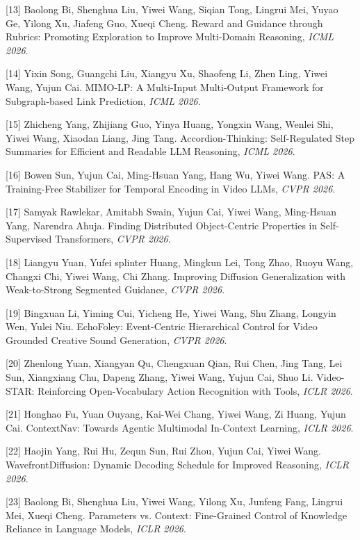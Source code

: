 [13] Baolong Bi, Shenghua Liu, Yiwei Wang, Siqian Tong, Lingrui Mei, Yuyao Ge, Yilong Xu, Jiafeng Guo, Xueqi Cheng. Reward and Guidance through Rubrics: Promoting Exploration to Improve Multi-Domain Reasoning, \textit{ICML 2026}.

[14] Yixin Song, Guangchi Liu, Xiangyu Xu, Shaofeng Li, Zhen Ling, Yiwei Wang, Yujun Cai. MIMO-LP: A Multi-Input Multi-Output Framework for Subgraph-based Link Prediction, \textit{ICML 2026}.

[15] Zhicheng Yang, Zhijiang Guo, Yinya Huang, Yongxin Wang, Wenlei Shi, Yiwei Wang, Xiaodan Liang, Jing Tang. Accordion-Thinking: Self-Regulated Step Summaries for Efficient and Readable LLM Reasoning, \textit{ICML 2026}.

[16] Bowen Sun, Yujun Cai, Ming-Hsuan Yang, Hang Wu, Yiwei Wang. PAS: A Training-Free Stabilizer for Temporal Encoding in Video LLMs, \textit{CVPR 2026}.

[17] Samyak Rawlekar, Amitabh Swain, Yujun Cai, Yiwei Wang, Ming-Hsuan Yang, Narendra Ahuja. Finding Distributed Object-Centric Properties in Self-Supervised Transformers, \textit{CVPR 2026}.

[18] Liangyu Yuan, Yufei splinter Huang, Mingkun Lei, Tong Zhao, Ruoyu Wang, Changxi Chi, Yiwei Wang, Chi Zhang. Improving Diffusion Generalization with Weak-to-Strong Segmented Guidance, \textit{CVPR 2026}.

[19] Bingxuan Li, Yiming Cui, Yicheng He, Yiwei Wang, Shu Zhang, Longyin Wen, Yulei Niu. EchoFoley: Event-Centric Hierarchical Control for Video Grounded Creative Sound Generation, \textit{CVPR 2026}.

[20] Zhenlong Yuan, Xiangyan Qu, Chengxuan Qian, Rui Chen, Jing Tang, Lei Sun, Xiangxiang Chu, Dapeng Zhang, Yiwei Wang, Yujun Cai, Shuo Li. Video-STAR: Reinforcing Open-Vocabulary Action Recognition with Tools, \textit{ICLR 2026}.

[21] Honghao Fu, Yuan Ouyang, Kai-Wei Chang, Yiwei Wang, Zi Huang, Yujun Cai. ContextNav: Towards Agentic Multimodal In-Context Learning, \textit{ICLR 2026}.

[22] Haojin Yang, Rui Hu, Zequn Sun, Rui Zhou, Yujun Cai, Yiwei Wang. WavefrontDiffusion: Dynamic Decoding Schedule for Improved Reasoning, \textit{ICLR 2026}.

[23] Baolong Bi, Shenghua Liu, Yiwei Wang, Yilong Xu, Junfeng Fang, Lingrui Mei, Xueqi Cheng. Parameters vs. Context: Fine-Grained Control of Knowledge Reliance in Language Models, \textit{ICLR 2026}.

